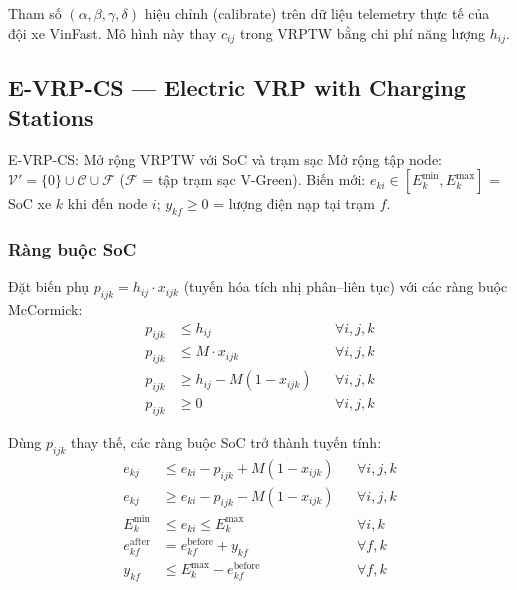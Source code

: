 \documentclass[12pt,a4paper]{article}
\begin{document}
Tham số $(\alpha,\beta,\gamma,\delta)$ hiệu chỉnh (calibrate) trên dữ liệu telemetry
thực tế của đội xe VinFast. Mô hình này thay $c_{ij}$ trong VRPTW bằng
chi phí năng lượng $h_{ij}$.

\subsection{E-VRP-CS --- Electric VRP with Charging Stations}

\begin{evbox}{E-VRP-CS: Mở rộng VRPTW với SoC và trạm sạc}
Mở rộng tập node: $\mathcal{V}' = \{0\}\cup\mathcal{C}\cup\mathcal{F}$
($\mathcal{F}$ = tập trạm sạc V-Green).
Biến mới:
$e_{ki}\in[E_k^{\min},E_k^{\max}]$ = SoC xe $k$ khi đến node $i$;
$y_{kf}\geq 0$ = lượng điện nạp tại trạm $f$.
\end{evbox}

\subsubsection{Ràng buộc SoC}

Đặt biến phụ $p_{ijk} = h_{ij}\cdot x_{ijk}$ (tuyến hóa tích nhị phân--liên tục)
với các ràng buộc McCormick:
\begin{align}
  p_{ijk} &\leq h_{ij} &&\forall i,j,k \tag{P1}\\
  p_{ijk} &\leq M\cdot x_{ijk} &&\forall i,j,k \tag{P2}\\
  p_{ijk} &\geq h_{ij} - M(1-x_{ijk}) &&\forall i,j,k \tag{P3}\\
  p_{ijk} &\geq 0 &&\forall i,j,k \tag{P4}
\end{align}

Dùng $p_{ijk}$ thay thế, các ràng buộc SoC trở thành tuyến tính:
\begin{align}
  e_{kj} &\leq e_{ki} - p_{ijk} + M(1-x_{ijk}) &&\forall i,j,k
            \tag{E1a: SoC upper}\\
  e_{kj} &\geq e_{ki} - p_{ijk} - M(1-x_{ijk}) &&\forall i,j,k
            \tag{E1b: SoC lower}\\
  E_k^{\min} &\leq e_{ki} \leq E_k^{\max} &&\forall i,k
              \tag{E2: SoC bound}\\
  e_{kf}^{\mathrm{after}} &= e_{kf}^{\mathrm{before}} + y_{kf} &&\forall f,k
                            \tag{E3: Charging gain}\\
  y_{kf} &\leq E_k^{\max} - e_{kf}^{\mathrm{before}} &&\forall f,k
          \tag{E4: Không sạc quá đầy}
\end{align}
\end{document}
